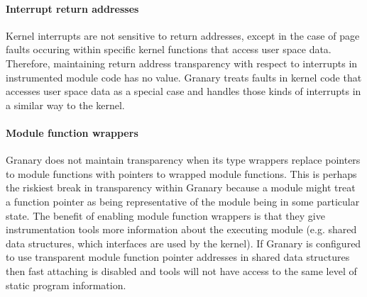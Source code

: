 \documentclass[letterpaper,twocolumn,10pt]{article}
\begin{document}
\paragraph{Interrupt return addresses} Kernel interrupts are not sensitive to return addresses, except in the case of page faults occuring within specific kernel functions that access user space data. Therefore, maintaining return address transparency with respect to interrupts in instrumented module code has no value. Granary treats faults in kernel code that accesses user space data as a special case and handles those kinds of interrupts in a similar way to the kernel.


\paragraph{Module function wrappers} Granary does not maintain transparency when its type wrappers replace pointers to module functions with pointers to wrapped module functions. This is perhaps the riskiest break in transparency within Granary because a module might treat a function pointer as being representative of the module being in some particular state. The benefit of enabling module function wrappers is that they give instrumentation tools more information about the executing module (e.g. shared data structures, which interfaces are used by the kernel). If Granary is configured to use transparent module function pointer addresses in shared data structures then fast attaching is disabled and tools will not have access to the same level of static program information.





\end{document}
